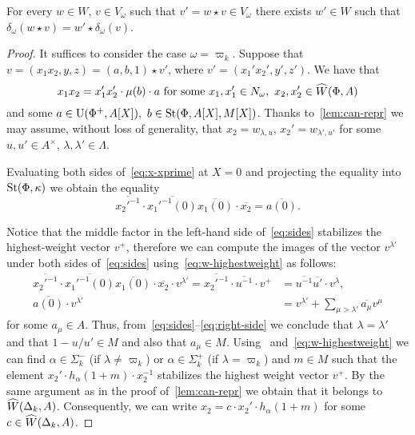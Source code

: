 \begin{prop} \label{prop:v-correctness2}
 For every $w \in W$, $v \in V_\omega$ such that $v' = w \star v \in V_\omega$ there exists $w' \in W$ such that
  $\delta_\omega(w \star v) = w' \star \delta_\omega(v)$.
\end{prop}
\begin{proof}
 It suffices to consider the case $\omega = \varpi_k$.
 Suppose that $v = (x_1 x_2, y, z) = (a, b, 1) \star v'$, where $v' = (x_1' x_2', y', z')$.
 We have that
 \begin{equation}\label{eq:x-xprime} x_1 x_2 = x_1' x_2' \cdot \mu(b) \cdot a  \text{ for some }x_1, x_1' \in N_\omega,\ x_2, x_2' \in \widehat{W}(\Phi, A) \end{equation}
 and some $a \in \operatorname{U}(\Phi^+, A[X]),\ b \in \operatorname{St}(\Phi, A[X], M[X])$.
 Thanks to~\cref{lem:can-repr} we may assume, without loss of generality, that $x_2 = w_{\lambda, u}$, $x_2' = w_{\lambda', u'}$
 for some $u, u' \in A^\times$, $\lambda, \lambda' \in \Lambda$.

 Evaluating both sides of~\eqref{eq:x-xprime} at $X=0$ and projecting the equality into $\operatorname{St}(\Phi, \kappa)$ we obtain the equality
 \begin{equation} \label{eq:sides}
 \overline{{x_2'}^{-1}} \cdot \overline{{x_1'}^{-1}(0)} \overline{x_1(0)} \cdot \overline{x_2} = \overline{a(0)}.
 \end{equation}

 Notice that the middle factor in the left-hand side of~\eqref{eq:sides} stabilizes the highest-weight vector $v^+$,
 therefore we can compute the images of the vector $v^{\lambda'}$ under both sides of~\eqref{eq:sides} using~\eqref{eq:w-highestweight} as follows:
 \begin{align} \overline{{x_2'}^{-1}} \cdot \overline{{x_1'}^{-1}(0)} \overline{x_1(0)} \cdot \overline{x_2} \cdot v^{\lambda'} = \overline{{x_2'}^{-1}} \cdot \overline{{u}^{-1}} \cdot v^+ &= \overline{u^{-1}}\overline{u'} \cdot v^\lambda, \\
               \overline{a(0)} \cdot v^{\lambda'} &= v^{\lambda'} + \sum_{\mu > \lambda'} \overline{a_\mu} v^\mu \label{eq:right-side} \end{align}
 for some $a_\mu \in A$.
 Thus, from~\eqref{eq:sides}--\eqref{eq:right-side} we conclude that $\lambda = \lambda'$ and that $1 - u/u' \in M$ and also that $a_\mu \in M$.
 Using~\cite[Lemma~7]{V00} and~\eqref{eq:w-highestweight} we can find $\alpha \in \Sigma_k^-$ (if $\lambda \neq \varpi_k$) or $\alpha \in \Sigma^+_k$ (if $\lambda = \varpi_k$)
  and $m \in M$ such that the element $x_2' \cdot h_\alpha(1+m) \cdot x_2^{-1}$ stabilizes the highest weight vector $v^+$.
 By the same argument as in the proof of~\cref{lem:can-repr} we obtain that it belongs to $\widehat{W}(\Delta_k, A)$.
 Consequently, we can write $x_2 = c \cdot x_2' \cdot h_\alpha(1+m)$ for some $c \in \widehat{W}(\Delta_k, A)$.



\end{proof}
